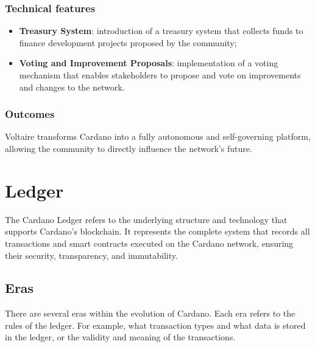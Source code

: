 \subsubsection*{Technical features}
\begin{itemize}
    \item \textbf{Treasury System}: introduction of a treasury system that collects funds 
        to finance development projects proposed by the community;
    \item \textbf{Voting and Improvement Proposals}: implementation of a voting mechanism 
        that enables stakeholders to propose and vote on improvements and changes to the 
        network.
\end{itemize}

\subsubsection*{Outcomes}
Voltaire transforms Cardano into a fully autonomous and self-governing platform, allowing 
the community to directly influence the network's future.

\vspace{0.5cm}

\section{Ledger}

The Cardano Ledger refers to the underlying structure and technology that supports 
Cardano's blockchain. It represents the complete system that records all transactions and 
smart contracts executed on the Cardano network, ensuring their security, transparency, 
and immutability.

\vspace{0.2cm}

\subsection{Eras}

There are several eras within the evolution of Cardano. Each era refers to the rules of 
the ledger. For example, what transaction types and what data is stored in the ledger, 
or the validity and meaning of the transactions.

\vspace{0.5cm}

